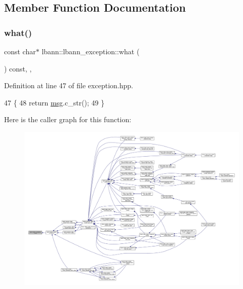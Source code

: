 \subsection{Member Function Documentation}
\mbox{\label{classlbann_1_1lbann__exception_ad36592ddd0ff6a24f31ec6a31b83e920}} 
\subsubsection{\texorpdfstring{what()}{what()}}
{\footnotesize\ttfamily const char$\ast$ lbann\+::lbann\+\_\+exception\+::what (\begin{DoxyParamCaption}{ }\end{DoxyParamCaption}) const\hspace{0.3cm}{\ttfamily [inline]}, {\ttfamily [override]}, {\ttfamily [noexcept]}}



Definition at line 47 of file exception.\+hpp.


\begin{DoxyCode}
47                                              \{
48     \textcolor{keywordflow}{return} \hyperlink{classlbann_1_1lbann__exception_a8698ff209b53c8452b5ca1d0caf7b824}{msg}.c\_str();
49   \}
\end{DoxyCode}
Here is the caller graph for this function\+:\nopagebreak
\begin{figure}[H]
\begin{center}
\leavevmode
\includegraphics[width=350pt]{classlbann_1_1lbann__exception_ad36592ddd0ff6a24f31ec6a31b83e920_icgraph}
\end{center}
\end{figure}


